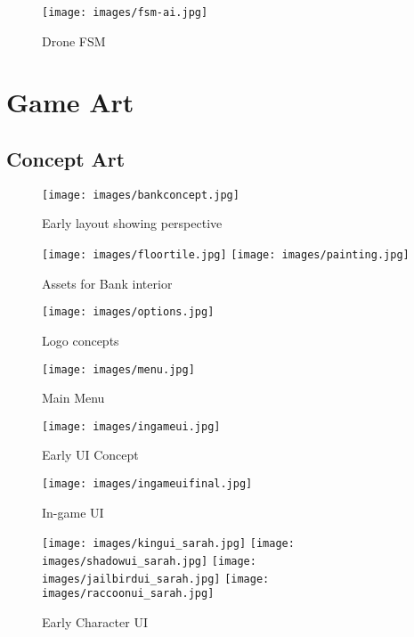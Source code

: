 \documentclass[11pt]{report}
\begin{document}
\begin{figure}[h!]
	\texttt{[image: images/fsm-ai.jpg]}
	\caption{Drone FSM}
\end{figure}

\chapter{Game Art}

\section{Concept Art}

\begin{figure}[H]
	\texttt{[image: images/bankconcept.jpg]}
    \caption{Early layout showing perspective}
\end{figure}

\begin{figure}[H]
    \centering
    \texttt{[image: images/floortile.jpg]}
    \texttt{[image: images/painting.jpg]}
    \caption{Assets for Bank interior}
\end{figure}

\begin{figure}[H]
	\texttt{[image: images/options.jpg]}
    \caption{Logo concepts}
\end{figure}

\begin{figure}[H]
	\texttt{[image: images/menu.jpg]}
    \caption{Main Menu}
\end{figure}

\begin{figure}[H]
	\texttt{[image: images/ingameui.jpg]}
    \caption{Early UI Concept}
\end{figure}

\begin{figure}[H]
	\texttt{[image: images/ingameuifinal.jpg]}
    \caption{In-game UI}
\end{figure}

\begin{figure}[H]
    \centering
	\texttt{[image: images/kingui\_sarah.jpg]}
	\texttt{[image: images/shadowui\_sarah.jpg]}
	\texttt{[image: images/jailbirdui\_sarah.jpg]}
	\texttt{[image: images/raccoonui\_sarah.jpg]}
    \caption{Early Character UI}
\end{figure}
\end{document}
